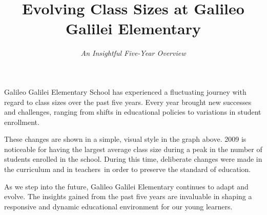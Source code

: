 \documentclass[a4paper,12pt]{article}
\title{\color{pagetitlecolor}\textbf{Evolving Class Sizes at Galileo Galilei Elementary}}
\author{\textit{An Insightful Five-Year Overview}}
\date{}
\begin{document}
\maketitle
\thispagestyle{empty}

Galileo Galilei Elementary School has experienced a fluctuating journey with regard to class sizes over the past five years. Every year brought new successes and challenges, ranging from shifts in educational policies to variations in student enrollment.
\vspace{1em}

\begin{center}
\end{center}

These changes are shown in a simple, visual style in the graph above. 2009 is noticeable for having the largest average class size during a peak in the number of students enrolled in the school. During this time, deliberate changes were made in the curriculum and in teachers in order to preserve the standard of education.

As we step into the future, Galileo Galilei Elementary continues to adapt and evolve. The insights gained from the past five years are invaluable in shaping a responsive and dynamic educational environment for our young learners.
\end{document}
